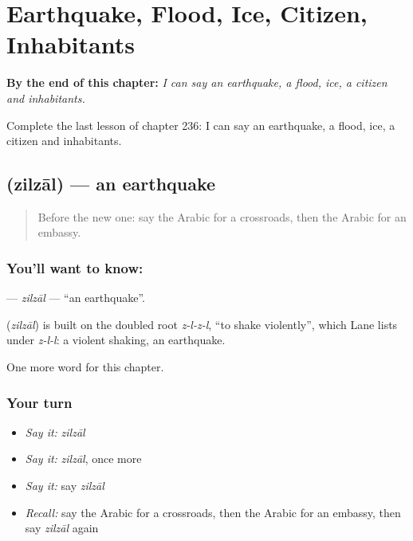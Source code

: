 
\chapter{Earthquake, Flood, Ice, Citizen, Inhabitants}
\label{ch:ar-earthquake-flood-ice-citizen-inhabitants}

\begin{chapteropening}
\textbf{By the end of this chapter:} \emph{I can say an earthquake, a flood, ice, a citizen and inhabitants.}

Complete the last lesson of chapter 236: I can say an earthquake, a flood, ice, a citizen and inhabitants.
\end{chapteropening}

\section[\texorpdfstring{\ar{زلزال} (zilzāl)}{زلزال (zilzāl)}]{ (zilzāl) — an earthquake}

\label{lesson:AR-C236-zilzal}



\begin{quote}
Before the new one: say the Arabic for a crossroads, then the Arabic for an embassy.
\end{quote}

\subsection*{You'll want to know: }
\textbf{} — \emph{zilzāl} — \textquotedblleft{}an earthquake\textquotedblright{}.

\begin{cousinweb}
\textbf{} (\emph{zilzāl}) is built on the doubled root \emph{z-l-z-l}, \textquotedblleft{}to shake violently\textquotedblright{}, which Lane lists under \emph{z-l-l}: a violent shaking, an earthquake.
\end{cousinweb}

\begin{grammarlens}[title={What you've built}]
One more word for this chapter.
\end{grammarlens}

\subsection*{Your turn}
\begin{itemize}
\raggedright
  \item \emph{Say it:} \emph{zilzāl}
  \item \emph{Say it:} \emph{zilzāl}, once more
  \item \emph{Say it:} say \emph{zilzāl}
  \item \emph{Recall:} say the Arabic for a crossroads, then the Arabic for an embassy, then say \emph{zilzāl} again
\end{itemize}

